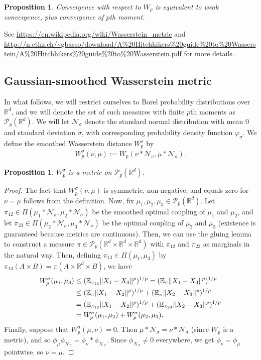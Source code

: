 \documentclass{article}
\newtheorem{proposition}[theorem]{Proposition}
\newcommand{\R}{\mathbb{R}}
\newcommand{\E}{\mathbb{E}}
\newcommand{\N}{\mathcal{N}}
\renewcommand{\P}{\mathcal{P}}
\DeclarePairedDelimiter{\norm}{\lVert}{\rVert}
\begin{document}
\begin{proposition}
Convergence with respect to $W_p$ is equivalent to weak convergence, plus convergence of $p$th moment.
\end{proposition}
See \url{https://en.wikipedia.org/wiki/Wasserstein_metric} and \url{http://n.ethz.ch/~gbasso/download/A%20Hitchhikers%20guide%20to%20Wasserstein/A%20Hitchhikers%20guide%20to%20Wasserstein.pdf} for more details.

\subsection{Gaussian-smoothed Wasserstein metric}

In what follows, we will restrict ourselves to Borel probability distributions over $\R^d$, and we will denote the set of such measures with finite $p$th moments as $\P_p(\R^d)$. We will let $\N_\sigma$ denote the standard normal distribution with mean 0 and standard deviation $\sigma$, with corresponding probability density function $\varphi_\sigma$. We define the smoothed Wasserstein distance $W_p^\sigma$ by
\begin{align*}
    W_p^\sigma(\nu,\mu) := W_p(\nu * \N_\sigma, \mu * \N_\sigma).
\end{align*}

\begin{proposition}
    $W_p^\sigma$ is a metric on $\P_p(\R^d)$.
\end{proposition}
\begin{proof}
    The fact that $W_p^\sigma(\nu,\mu)$ is symmetric, non-negative, and equals zero for $\nu=\mu$ follows from the definition. Now, fix $\mu_1, \mu_2, \mu_3 \in \P_p(\R^d)$. Let $\pi_{12} \in \Pi(\mu_1 * \N_\sigma, \mu_2 * \N_\sigma)$ be the smoothed optimal coupling of $\mu_1$ and $\mu_2$, and let $\pi_{23} \in \Pi(\mu_2 * \N_\sigma, \mu_3 * \N_\sigma)$ be the optimal coupling of $\mu_2$ and $\mu_3$ (existence is guaranteed because metrics are continuous). Then, we can use the gluing lemma to construct a measure $\pi \in \P_p(\R^d \times \R^d \times \R^d)$ with $\pi_{12}$ and $\pi_{23}$ as marginals in the natural way. Then, defining $\pi_{13} \in \Pi(\mu_1, \mu_3)$ by $\pi_{13}(A \times B) = \pi(A \times \R^d \times B)$, we have
    \begin{align*}
        W_p^\sigma(\mu_1, \mu_3) &\leq (\E_{\pi_{13}}\norm{X_1 - X_3}^p)^{1/p} = (\E_{\pi}\norm{X_1 - X_3}^p)^{1/p}\\
        &\leq (\E_{\pi} \norm{X_1 - X_2}^p)^{1/p} + (\E_{\pi}\norm{X_2 - X_3}^p)^{1/p}\\
        &= (\E_{\pi_{12}} \norm{X_1 - X_2}^p)^{1/p} + (\E_{\pi_{23}}\norm{X_2 - X_3}^p)^{1/p}\\
        &= W_p^\sigma(\mu_1, \mu_2) + W_p^\sigma(\mu_2, \mu_3).
    \end{align*}
    Finally, suppose that $W_p^\sigma(\mu, \nu) = 0$. Then $\mu * \N_\sigma = \nu * \N_\sigma$ (since $W_p$ is a metric), and so $\phi_\mu \phi_{\N_\sigma} = \phi_\nu * \phi_{\N_\sigma}$. Since $\phi_{\N_\sigma} \neq 0$ everywhere, we get $\phi_\nu = \phi_\mu$ pointwise, so $\nu = \mu$.
\end{proof}
\end{document}
